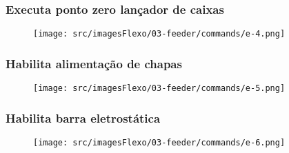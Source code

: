 \newpage
\thispagestyle{fancy}
\vspace*{\fill}
\subsubsection{\small{Executa ponto zero lançador de caixas}}
\begin{figure}[h]
  \centering
  \texttt{[image: src/imagesFlexo/03-feeder/commands/e-4.png]}
   \label{}
\end{figure}
\vspace*{\fill}

\newpage
\thispagestyle{fancy}
\vspace*{\fill}
\subsubsection{\small{Habilita alimentação de chapas}}
\begin{figure}[h]
  \centering
  \texttt{[image: src/imagesFlexo/03-feeder/commands/e-5.png]}
   \label{}
\end{figure}
\vspace*{\fill}

\newpage
\thispagestyle{fancy}
\vspace*{\fill}
\subsubsection{\small{Habilita barra eletrostática}}
\begin{figure}[h]
  \centering
  \texttt{[image: src/imagesFlexo/03-feeder/commands/e-6.png]}
   \label{}
\end{figure}
\vspace*{\fill}